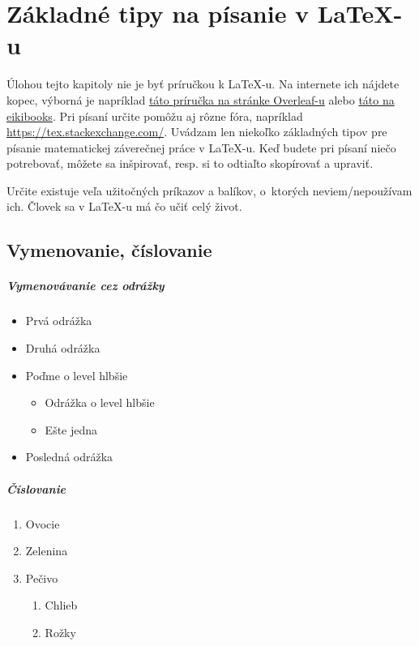 \chapter{Základné tipy na písanie v \LaTeX-u} \label{sec:tipy}

Úlohou tejto kapitoly nie je byť príručkou k LaTeX-u. Na internete ich nájdete kopec, výborná je napríklad \href{https://www.overleaf.com/learn}{táto príručka na stránke Overleaf-u} alebo \href{https://en.wikibooks.org/wiki/LaTeX}{táto na eikibooks}. Pri písaní určite pomôžu aj rôzne fóra, napríklad \href{https://tex.stackexchange.com/}{https://tex.stackexchange.com/}. Uvádzam len niekoľko základných tipov pre písanie matematickej záverečnej práce v LaTeX-u. Keď budete pri písaní niečo potrebovať, môžete sa inšpirovať, resp. si to odtiaľto skopírovať a upraviť.

Určite existuje veľa užitočných príkazov a balíkov, o~ktorých neviem/nepoužívam ich. Človek sa v LaTeX-u má čo učiť celý život.

\section{Vymenovanie, číslovanie}

\paragraph{Vymenovávanie cez odrážky}
\begin{itemize}
	\item Prvá odrážka
	\item Druhá odrážka
	\item Poďme o level hlbšie
	\begin{itemize}
		\item Odrážka o level hlbšie
		\item Ešte jedna 
	\end{itemize}
	\item Posledná odrážka
\end{itemize}

\paragraph{Číslovanie}
\begin{enumerate}
	\item Ovocie
	\item Zelenina
	\item Pečivo
	\begin{enumerate}
		\item Chlieb
		\item Rožky
	\end{enumerate}
\end{enumerate}


